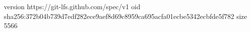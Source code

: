 version https://git-lfs.github.com/spec/v1
oid sha256:372b04b739d7edf282ece9aef8d69c8959ca695acfa01ecbe5342ecbfde5f782
size 5566
